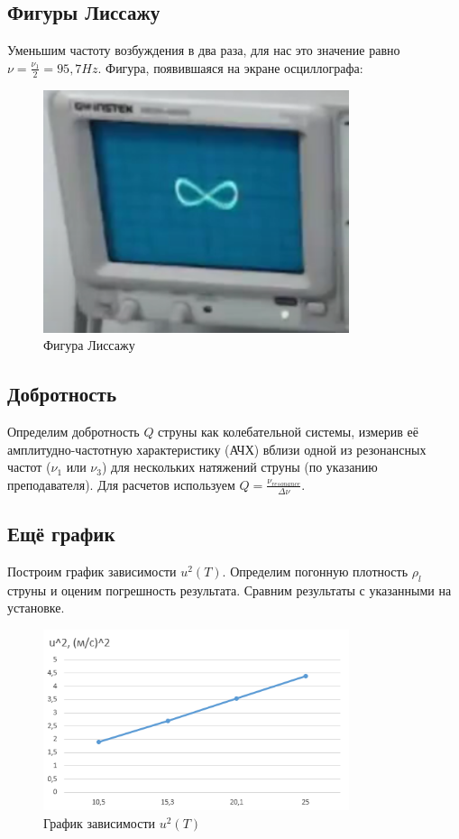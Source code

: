 \documentclass[13pt,a4paper]{article}
\begin{document}
\subsection{Фигуры Лиссажу}
Уменьшим частоту возбуждения в два раза, для нас это значение равно $\nu=\frac{\nu_{1}}{2}=95,7 Hz$. Фигура, появившаяся на экране осциллографа:
\begin{figure}[h!]
	\begin{center}
		\includegraphics[width = 0.8\textwidth]{lissajous}
		\caption{Фигура Лиссажу}
		\label{fig:u2t}
	\end{center}
\end{figure}

\subsection{Добротность}
Определим добротность $Q$ струны как колебательной системы, измерив её амплитудно-частотную характеристику (АЧХ) вблизи одной из резонансных частот ($\nu_{1}$ или $\nu_{3}$) для нескольких натяжений струны (по указанию преподавателя).
Для расчетов используем $Q=\frac{\nu_{resonance}}{\Delta\nu}$.


\subsection{Ещё график}
Построим график зависимости $u^2(T)$. Определим погонную плотность $\rho_{l}$ струны и оценим погрешность результата. Сравним результаты с указанными на установке.
\begin{figure}[h!]
	\begin{center}
		\includegraphics[width = 0.8\textwidth]{u2t}
		\caption{График зависимости $u^2(T)$}
		\label{fig:u2t}
	\end{center}
\end{figure}
\end{document}
